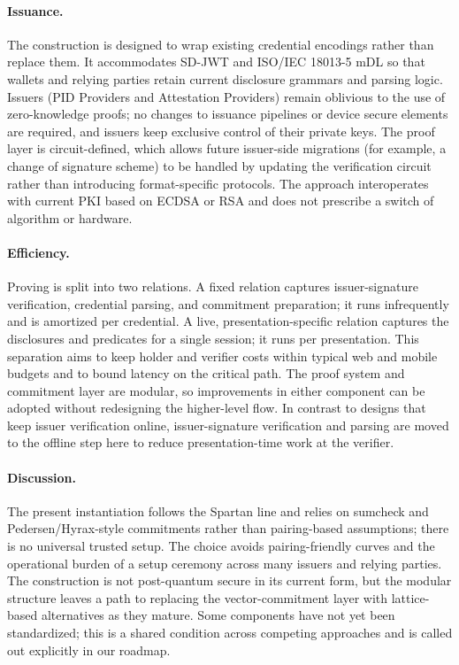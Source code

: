 \paragraph{Issuance.}
The construction is designed to wrap existing credential encodings rather than replace them. It accommodates SD-JWT and ISO/IEC 18013-5 mDL so that wallets and relying parties retain current disclosure grammars and parsing logic. Issuers (PID Providers and Attestation Providers) remain oblivious to the use of zero-knowledge proofs; no changes to issuance pipelines or device secure elements are required, and issuers keep exclusive control of their private keys. The proof layer is circuit-defined, which allows future issuer-side migrations (for example, a change of signature scheme) to be handled by updating the verification circuit rather than introducing format-specific protocols. The approach interoperates with current PKI based on ECDSA or RSA and does not prescribe a switch of algorithm or hardware.

\paragraph{Efficiency.}
Proving is split into two relations. A fixed relation captures issuer-signature verification, credential parsing, and commitment preparation; it runs infrequently and is amortized per credential. A live, presentation-specific relation captures the disclosures and predicates for a single session; it runs per presentation. This separation aims to keep holder and verifier costs within typical web and mobile budgets and to bound latency on the critical path. The proof system and commitment layer are modular, so improvements in either component can be adopted without redesigning the higher-level flow. In contrast to designs that keep issuer verification online, issuer-signature verification and parsing are moved to the offline step here to reduce presentation-time work at the verifier.

\paragraph{Discussion.}
The present instantiation follows the Spartan line and relies on sumcheck and Pedersen/Hyrax-style commitments rather than pairing-based assumptions; there is no universal trusted setup. The choice avoids pairing-friendly curves and the operational burden of a setup ceremony across many issuers and relying parties. The construction is not post-quantum secure in its current form, but the modular structure leaves a path to replacing the vector-commitment layer with lattice-based alternatives as they mature. Some components have not yet been standardized; this is a shared condition across competing approaches and is called out explicitly in our roadmap.

